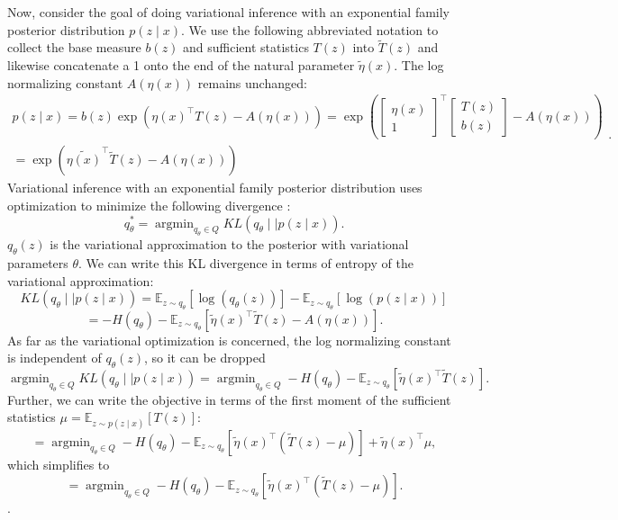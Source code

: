 \documentclass[11pt]{article}
\DeclareMathOperator*{\argmin}{argmin}
\begin{document}
Now, consider the goal of doing variational inference with an exponential family posterior distribution $p(z \mid x)$.  We use the following abbreviated notation to collect the base measure $b(z)$ and sufficient statistics $T(z)$ into $\tilde{T}(z)$ and likewise concatenate a 1 onto the end of the natural parameter $\tilde{\eta}(x)$.  The log normalizing constant $A(\eta(x))$ remains unchanged:
\begin{equation}
\begin{split}
p(z \mid x) = b(z) \exp{\left( \eta(x)^\top T(z) - A(\eta(x)) \right)} = \exp{\left( \begin{bmatrix} \eta(x) \\ 1 \end{bmatrix}^\top \begin{bmatrix} T(z) \\ b(z) \end{bmatrix} - A(\eta(x)) \right)} \\= \exp{\left(\tilde{\eta(x)}^\top \tilde{T}(z) - A(\eta(x)) \right)} 
\end{split}.
\end{equation}
Variational inference with an exponential family posterior distribution uses optimization to minimize the following divergence \cite{blei2017variational}:
\begin{equation}
q_\theta^* = \argmin_{q_\theta \in Q} KL(q_\theta \mid \mid p(z \mid x)).
\end{equation}
$q_\theta(z)$ is the variational approximation to the posterior with variational parameters $\theta$.  We can write this KL divergence in terms of entropy of the variational approximation:
\begin{equation}
KL(q_\theta \mid \mid p(z \mid x)) = \mathbb{E}_{z \sim q_\theta} \left[ \log (q_\theta(z)) \right] - \mathbb{E}_{z \sim q_\theta} \left[ \log (p(z \mid x)) \right]
\end{equation}
\begin{equation}
 = -H(q_\theta) - \mathbb{E}_{z \sim q_\theta} \left[ \tilde{\eta}(x)^\top  \tilde{T}(z) - A(\eta(x)) \right].
\end{equation}
As far as the variational optimization is concerned, the log normalizing constant is independent of $q_\theta(z)$, so it can be dropped
\begin{equation}
\argmin_{q_\theta \in Q} KL(q_\theta \mid \mid p(z \mid x)) =  \argmin_{q_\theta \in Q} -H(q_\theta) - \mathbb{E}_{z \sim q_\theta} \left[ \tilde{\eta}(x)^\top  \tilde{T}(z) \right].
\end{equation}
 Further, we can write the objective in terms of the first moment of the sufficient statistics $\mu = \mathbb{E}_{z \sim p(z \mid x)}\left[T(z) \right]$:
 \begin{equation}
=  \argmin_{q_\theta \in Q} -H(q_\theta) - \mathbb{E}_{z \sim q_\theta} \left[ \tilde{\eta}(x)^\top \left(  \tilde{T}(z) -\mu \right) \right] + \tilde{\eta}(x)^\top \mu,
 \end{equation}
which simplifies to
  \begin{equation}
=  \argmin_{q_\theta \in Q} -H(q_\theta) - \mathbb{E}_{z \sim q_\theta} \left[ \tilde{\eta}(x)^\top \left(  \tilde{T}(z) -\mu \right) \right].
 \end{equation}.
\end{document}
